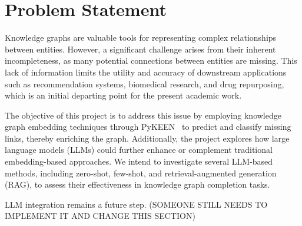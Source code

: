 \section*{Problem Statement}


Knowledge graphs are valuable tools for representing complex relationships between entities. However, a significant challenge arises from their inherent incompleteness, as many potential connections between entities are missing. This lack of information limits the utility and accuracy of downstream applications such as recommendation systems, biomedical research, and drug repurposing, which is an initial departing point for the present academic work.

The objective of this project is to address this issue by employing knowledge graph embedding techniques through PyKEEN~\cite{pykeen} to predict and classify missing links, thereby enriching the graph. Additionally, the project explores how large language models (LLMs) could further enhance or complement traditional embedding-based approaches. We intend to investigate several LLM-based methods, including zero-shot, few-shot, and retrieval-augmented generation (RAG), to assess their effectiveness in knowledge graph completion tasks.

\textcolor{todo}{LLM integration remains a future step. (SOMEONE STILL NEEDS TO IMPLEMENT IT AND CHANGE THIS SECTION})
